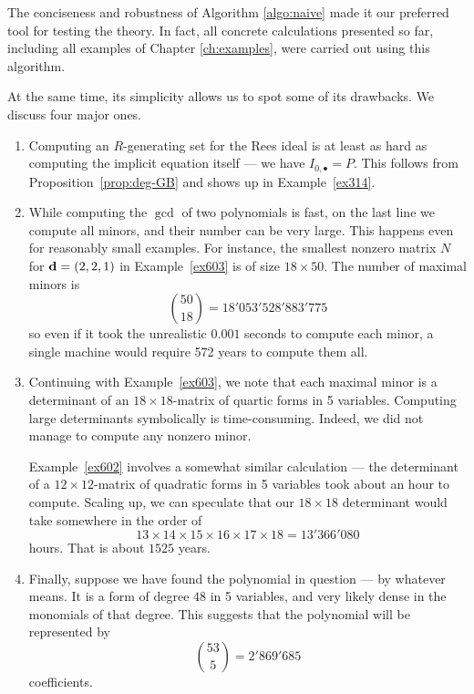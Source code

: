 \documentclass[fleqn,reqno]{amsart}
\numberwithin{first}{chapter}
\begin{document}
\begin{paragraf}
\label{par:flaws}
The conciseness and robustness of Algorithm \ref{algo:naive} made it our preferred tool
for testing the theory.
In fact, all concrete calculations presented so far,
including all examples of Chapter \ref{ch:examples},
were carried out using this algorithm.

At the same time, its simplicity allows us to spot some of its drawbacks.
We discuss four major ones.
\begin{enumerate}
\item
\label{itm:flaws:GB}
Computing an $R$-generating set for the Rees ideal is at least as hard as
computing the implicit equation itself --- we have $I_{0,\bullet}=P$.
This follows from Proposition~\ref{prop:deg-GB} and shows up in Example~\ref{ex314}.

\item
\label{itm:flaws:many-minors}
While computing the $\gcd$ of two polynomials is fast,
on the last line we compute all minors,
and their number can be very large.
This happens even for reasonably small examples.
For instance, the smallest nonzero matrix $N$ for $\mathbf d=(2,2,1)$ in Example~\ref{ex603}
is of size $18\times50$.
The number of maximal minors is
\[
	\binom{50}{18}=18'053'528'883'775
\]
so even if it took the unrealistic $0.001$ seconds to compute each minor,
a single machine would require 572 years to compute them all.

\item
\label{itm:flaws:large-det}
Continuing with Example~\ref{ex603},
we note that each maximal minor is a determinant of an $18\times18$-matrix
of quartic forms in 5 variables.
Computing large determinants symbolically is time-consuming.
Indeed, we did not manage to compute any nonzero minor.

Example~\ref{ex602} involves a somewhat similar calculation ---
the determinant of a $12\times12$-matrix of quadratic forms in 5 variables
took about an hour to compute.
Scaling up, we can speculate that our $18\times18$ determinant would take somewhere
in the order of
\[
	13\times14\times15\times16\times17\times18=13'366'080
\]
hours.
That is about $1525$ years.

\item
\label{itm:flaws:large-poly}
Finally, suppose we have found the polynomial in question --- by whatever means.
It is a form of degree $48$ in 5 variables, and very likely dense in the monomials of that degree.
This suggests that the polynomial will be represented by
\[
	\binom{53}{5}=2'869'685
\]
coefficients.
\end{enumerate}
\end{paragraf}
\end{document}
